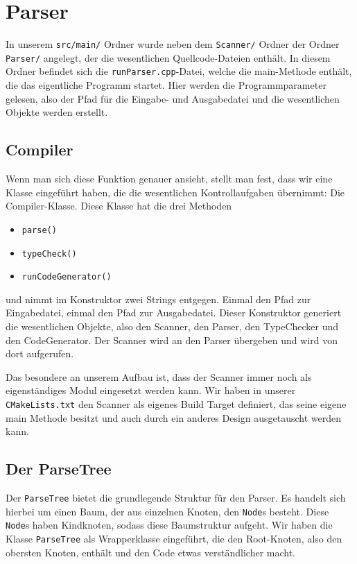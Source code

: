 \chapter{Parser}\label{chap:Parser}

In unserem \texttt{src/main/} Ordner wurde neben dem \texttt{Scanner/} Ordner der Ordner \texttt{Parser/} angelegt, der die wesentlichen Quellcode-Dateien enthält. In diesem Ordner befindet sich die \texttt{runParser.cpp}-Datei, welche die main-Methode enthält, die das eigentliche Programm startet. Hier werden die Programmparameter gelesen, also der Pfad für die Eingabe- und Ausgabedatei und die wesentlichen Objekte werden erstellt.

\section{Compiler}
Wenn man sich diese Funktion genauer ansieht, stellt man fest, dass wir eine Klasse eingeführt haben, die die wesentlichen Kontrollaufgaben übernimmt: Die Compiler-Klasse. Diese Klasse hat die drei Methoden
\begin{itemize}
\item \texttt{parse()}
\item \texttt{typeCheck()}
\item \texttt{runCodeGenerator()}
\end{itemize}

und nimmt im Konstruktor zwei Strings entgegen. Einmal den Pfad zur Eingabedatei, einmal den Pfad zur Ausgabedatei. Dieser Konstruktor generiert die wesentlichen Objekte, also den Scanner, den Parser, den TypeChecker und den CodeGenerator. Der Scanner wird an den Parser übergeben und wird von dort aufgerufen.

Das besondere an unserem Aufbau ist, dass der Scanner immer noch als eigenständiges Modul eingesetzt werden kann. Wir haben in unserer \texttt{CMakeLists.txt} den Scanner als eigenes Build Target definiert, das seine eigene main Methode besitzt und auch durch ein anderes Design ausgetauscht werden kann.

\section{Der ParseTree}
Der \texttt{ParseTree} bietet die grundlegende Struktur für den Parser. Es handelt sich hierbei um einen Baum, der aus einzelnen Knoten, den \texttt{Node}s besteht. Diese \texttt{Node}s haben Kindknoten, sodass diese Baumstruktur aufgeht. Wir haben die Klasse \texttt{ParseTree} als Wrapperklasse eingeführt, die den Root-Knoten, also den obersten Knoten, enthält und den Code etwas verständlicher macht.

